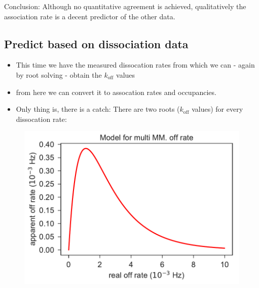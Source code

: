 \documentclass[a4paper,twoside]{revtex4-1}
\newcommand{\rate }[1]{\ensuremath{k_{\text{#1}}} }
\begin{document}
Conclusion: Although no quantitative agreement is achieved, qualitatively the association rate is a decent predictor of the other data. 

\subsection{Predict based on dissociation data}
\begin{itemize}
\item This time we have the measured dissocation rates from which we can - again by root solving - obtain the $\rate{off}$ values 
\item from here we can convert it to assocation rates and occupancies. 
\item Only thing is, there is a catch: There are two roots ($\rate{off}$ values) for every dissocation rate:
\end{itemize}


\begin{figure}[H]
\includegraphics[scale=0.5]{fig8_10_10_2018.pdf}
\end{figure}
\end{document}
